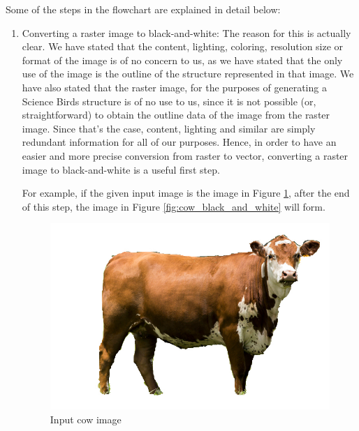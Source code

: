 \documentclass{dalthesis}
\begin{document}
Some of the steps in the flowchart are explained in detail below:

\begin{enumerate}
  \item Converting a raster image to black-and-white: The reason for this is actually clear. We have stated that the content, lighting, coloring, resolution size or format of the image is of no concern to us, as we have stated that the only use of the image is the outline of the structure represented in that image. We have also stated that the raster image, for the purposes of generating a Science Birds structure is of no use to us, since it is not possible (or, straightforward) to obtain the outline data of the image from the raster image. Since that's the case, content, lighting and similar are simply redundant information for all of our purposes. Hence, in order to have an easier and more precise conversion from raster to vector, converting a raster image to black-and-white is a useful first step.

  For example, if the given input image is the image in Figure \ref{fig:cow_input}, after the end of this step, the image in Figure \ref{fig:cow_black_and_white} will form.

  \begin{figure}
    \centering
		\caption{Input cow image}
		\label{fig:cow_input}
    \includegraphics[width=\textwidth,height=\textheight,keepaspectratio]{process/cow.jpg}
  \end{figure}


\end{enumerate}
\end{document}
